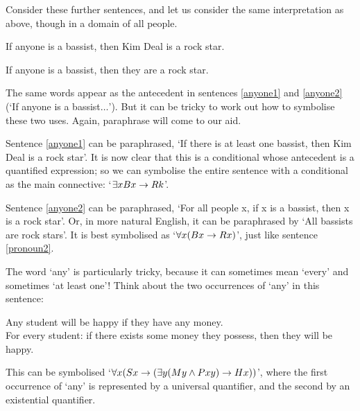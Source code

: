 Consider these further sentences, and let us consider the same interpretation as above, though in a domain of all people.
	\begin{earg}
		\item[\ex{anyone1}] If anyone is a bassist, then Kim Deal is a rock star.
		\item[\ex{anyone2}] If anyone is a bassist, then they are a rock star.
	\end{earg}
The same words appear as the antecedent in sentences \ref{anyone1} and \ref{anyone2}  (`If anyone is a bassist$…$'). But it can be tricky to work out how to symbolise these two uses. Again, paraphrase will come to our aid. 

Sentence \ref{anyone1} can be paraphrased, `If there is at least one bassist, then Kim Deal is a rock star'. It is now clear that this is a conditional whose antecedent is a quantified expression; so we can symbolise the entire sentence with a conditional as the main connective: `$\exists x Bx \rightarrow Rk$'. 

Sentence \ref{anyone2} can be paraphrased, `For all people x, if x is a bassist, then x is a rock star'. Or, in more natural English, it can be paraphrased by `All bassists are rock stars'. It is best symbolised as `$\forall x(Bx \rightarrow Rx)$', just like sentence \ref{pronoun2}.

The word `any' is particularly tricky, because it can sometimes mean `every' and sometimes `at least one'! Think about the two occurrences of `any' in this sentence: \begin{earg}
\item[\ex{student.any}] Any student will be happy if they have any money.\\
 For every student: if there exists some money they possess, then they will  be happy.
\end{earg} This can be symbolised `$\forall x (Sx \rightarrow (\exists y (My \wedge Pxy) \rightarrow Hx))$', where the first occurrence of `any' is represented by a universal quantifier, and the second by an existential quantifier.  

